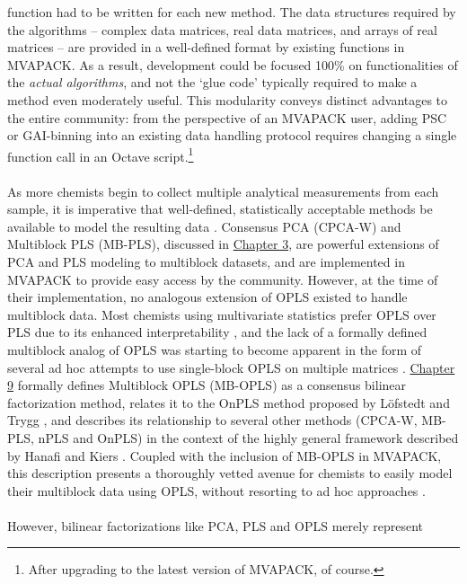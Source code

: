 \begin{doublespace}
function had to be written for each new method. The data structures
required by the algorithms -- complex data matrices, real data matrices,
and arrays of real matrices -- are provided in a well-defined format by
existing functions in MVAPACK. As a result, development could be focused
100\% on functionalities of the \emph{actual algorithms}, and not the
`glue code' typically required to make a method even moderately useful.
This modularity conveys distinct advantages to the entire community:
from the perspective of an MVAPACK user, adding PSC or GAI-binning into
an existing data handling protocol requires changing a single function
call in an Octave script.\footnote{After upgrading to the latest version
of MVAPACK, of course.}
\\\\
As more chemists begin to collect multiple analytical measurements from each
sample, it is imperative that well-defined, statistically acceptable methods
be available to model the resulting data \cite{westerhuis:jchemo1997,
  westerhuis:jchemo1998,smilde:jchemo2003,
  marshall:metab2015,worley:jchemo2015}. Consensus PCA (CPCA-W) and Multiblock
PLS (MB-PLS), discussed in \hyperlink{chapter.3}{Chapter 3}, are powerful
extensions of PCA and PLS modeling to multiblock datasets, and are implemented
in MVAPACK to provide easy access by the community. However, at the time of
their implementation, no analogous extension of OPLS existed to handle
multiblock data. Most chemists using multivariate statistics prefer OPLS
over PLS due to its enhanced
interpretability \cite{trygg:jchemo2002,tapp:trac2009}, and the lack of
a formally defined multiblock analog of OPLS was starting to become apparent
in the form of several ad hoc attempts to use single-block OPLS on multiple
matrices \cite{bylesjo:jpr2009,boccard:aca2013}.
\hyperlink{chapter.9}{Chapter 9} formally defines Multiblock OPLS (MB-OPLS)
as a consensus bilinear factorization method, relates it to the OnPLS method
proposed by L\"{o}fstedt and Trygg \cite{lofstedt:jchemo2011}, and describes
its relationship to several other methods (CPCA-W, MB-PLS, nPLS and OnPLS)
in the context of the highly general framework described by Hanafi and Kiers
\cite{hanafi:csda2006}. Coupled with the inclusion of MB-OPLS in MVAPACK,
this description presents a thoroughly vetted avenue for chemists to easily
model their multiblock data using OPLS, without resorting to ad hoc
approaches \cite{worley:jchemo2015}.
\\\\
However, bilinear factorizations like PCA, PLS and OPLS merely represent

\end{doublespace}
